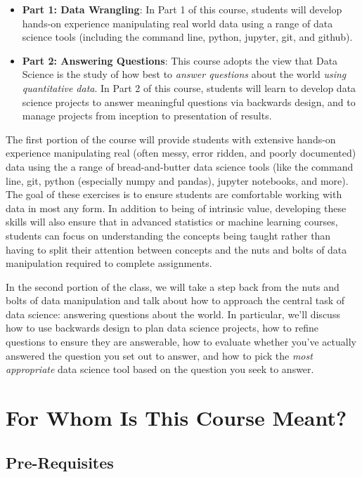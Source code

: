 \documentclass[12pt]{article}
\begin{document}
\begin{itemize}
	\item \textbf{Part 1: Data Wrangling}: In Part 1 of this course, students will develop hands-on experience manipulating real world data using a range of data science tools (including the command line, python, jupyter, git, and github).
	\item \textbf{Part 2: Answering Questions}: This course adopts the view that Data Science is the study of how best to \emph{answer questions} about the world \emph{using quantitative data}. In Part 2 of this course, students will learn to develop data science projects to answer meaningful questions via backwards design, and to manage projects from inception to presentation of results.
\end{itemize}

The first portion of the course will provide students with extensive hands-on experience manipulating real (often messy, error ridden, and poorly documented) data using the a range of bread-and-butter data science tools (like the command line, git, python (especially numpy and pandas), jupyter notebooks, and more). The goal of these exercises is to ensure students are comfortable working with data in most any form. In addition to being of intrinsic value, developing these skills will also ensure that in advanced statistics or machine learning courses, students can focus on understanding the concepts being taught rather than having to split their attention between concepts and the nuts and bolts of data manipulation required to complete assignments.

In the second portion of the class, we will take a step back from the nuts and bolts of data manipulation and talk about how to approach the central task of data science: answering questions about the world. In particular, we'll discuss how to use backwards design to plan data science projects, how to refine questions to ensure they are answerable, how to evaluate whether you've actually answered the question you set out to answer, and how to pick the \emph{most appropriate} data science tool based on the question you seek to answer.


\section{For Whom Is This Course Meant?}

\subsection{Pre-Requisites}
\end{document}
